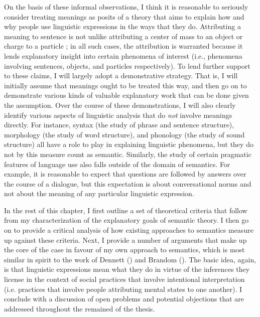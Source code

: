 On the basis of these informal observations, I think it is reasonable to seriously consider treating meanings as posits of a theory that aims to explain how and why people use linguistic expressions in the ways that they do. Attributing a meaning to sentence is not unlike attributing a center of mass to an object or charge to a particle \citep[see][]{Dennett:1987}; in all such cases, the attribution is warranted because it lends explanatory insight into certain phenomena of interest (i.e., phenomena involving sentences, objects, and particles respectively). To lend further support to these claims, I will largely adopt a demonstrative strategy. That is, I will initially assume that meanings ought to be treated this way, and then go on to demonstrate various kinds of valuable explanatory work that can be done given the assumption. Over the course of these demonstrations, I will also clearly identify various aspects of linguistic analysis that do \textit{not} involve meanings directly. For instance, syntax (the study of phrase and sentence structure), morphology (the study of word structure), and phonology (the study of sound structure) all have a role to play in explaining linguistic phenomena, but they do not by this measure count as semantic. Similarly, the study of certain pragmatic features of language use also falls outside of the domain of semantics. For example, it is reasonable to expect that questions are followed by answers over the course of a dialogue, but this expectation is about conversational norms and not about the meaning of any particular linguistic expression.

In the rest of this chapter, I first outline a set of theoretical criteria that follow from my characterization of the explanatory goals of semantic theory. I then go on to provide a critical analysis of how existing approaches to semantics measure up against these criteria. Next, I provide a number of arguments that make up the core of the case in favour of my own approach to semantics, which is most similar in spirit to the work of Dennett (\citeyear{Dennett:1987,Dennett:1991}) and Brandom (\citeyear{Brandom:1994,Brandom:2009,Brandom:2000}). The basic idea, again, is that linguistic expressions mean what they do in virtue of the inferences they license in the context of social practices that involve intentional interpretation (i.e. practices that involve people attributing mental states to one another). I conclude with a discussion of open problems and potential objections that are addressed throughout the remained of the thesis. 

